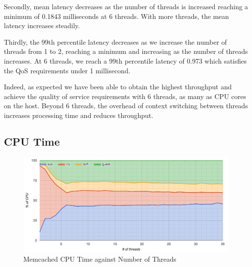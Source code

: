 Secondly, mean latency decreases as the number of threads is increased reaching a minimum of 0.1843 milliseconds at 6 threads. With more threads, the mean latency increases steadily.

Thirdly, the 99th percentile latency decreases as we increase the number of threads from 1 to 2, reaching a minimum and increasing as the number of threads increases. At 6 threads, we reach a 99th percentile latency of 0.973 which satisfies the QoS requirements under 1 millisecond.

Indeed, as expected we have been able to obtain the highest throughput and achieve the quality of service requirements with 6 threads, as many as CPU cores on the host. Beyond 6 threads, the overhead of context switching between threads increases processing time and reduces throughput.

\subsection{CPU Time}

\begin{figure}[h]
    \includegraphics[width=\textwidth]{./res/5_threads_cpu.png}
    \caption{Memcached CPU Time against Number of Threads}
    \label{fig:memcached-threads-cpu}
\end{figure}


